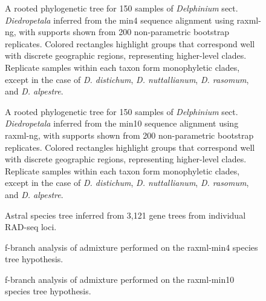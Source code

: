 \documentclass[11pt]{article}
\begin{document}
\begin{figure}[p]
	\centering
	\caption{
		A rooted phylogenetic tree for 150 samples of \emph{Delphinium} sect. \emph{Diedropetala}
		inferred from the min4 sequence alignment using raxml-ng, with supports shown from
		200 non-parametric bootstrap replicates. 
		Colored rectangles highlight
		groups that correspond well with discrete geographic regions, representing higher-level 
		clades. Replicate samples within each taxon form monophyletic clades, except in the case
		of \emph{D. distichum}, \emph{D. nuttallianum}, \emph{D. rasomum}, and \emph{D. alpestre}.
	}
	\label{fig:S2}
\end{figure}

\begin{figure}[p]
	\centering
	\caption{
		A rooted phylogenetic tree for 150 samples of \emph{Delphinium} sect. \emph{Diedropetala}
		inferred from the min10 sequence alignment using raxml-ng, with supports shown from
		200 non-parametric bootstrap replicates. 
		Colored rectangles highlight
		groups that correspond well with discrete geographic regions, representing higher-level 
		clades. Replicate samples within each taxon form monophyletic clades, except in the case
		of \emph{D. distichum}, \emph{D. nuttallianum}, \emph{D. rasomum}, and \emph{D. alpestre}.
	}
	\label{fig:S3}
\end{figure}

\begin{figure}[p]
	\centering
	\caption{
		Astral species tree inferred from 3,121 gene trees from individual RAD-seq loci.
	}
	\label{fig:S4}
\end{figure}

\begin{figure}[p]
	\centering
	\caption{
		f-branch analysis of admixture performed on the raxml-min4 species tree hypothesis.	
	}
	\label{fig:S5}
\end{figure}

\begin{figure}[p]
	\centering
	\caption{
		f-branch analysis of admixture performed on the raxml-min10 species tree hypothesis.
	}
	\label{fig:S6}
\end{figure}

\begin{table}[p]
	\centering
	\caption{
		Plant accessions used in this study with GPS coordinates and sample identifiers for vouchers stored at the USDA-ARS Poisonous Plant Research Laboratory in Logan, UT.
	}
	\label{fig:TableS1}
\end{table}

\begin{table}[p]
	\centering
	\caption{
		Dsuite f-branch analysis results performed on the caster min10 41-tip species tree hypothesis.
	}
	\label{fig:TableS2}
\end{table}
\end{document}

